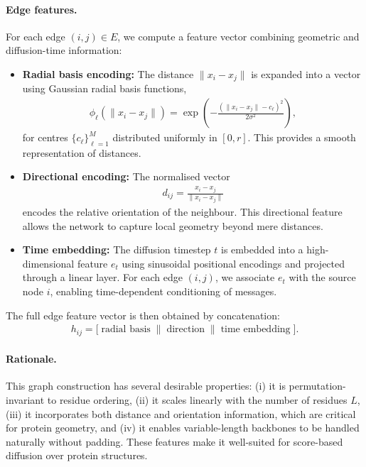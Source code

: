 \documentclass[a4paper,12pt]{article}
\begin{document}
\paragraph{Edge features.}
For each edge \((i,j) \in E\), we compute a feature vector combining geometric and diffusion-time information:
\begin{itemize}
    \item \textbf{Radial basis encoding:} The distance \(\|x_i - x_j\|\) is expanded into a vector using Gaussian radial basis functions,
        \begin{align*}
            \phi_\ell(\|x_i - x_j\|) = \exp\!\left(-\frac{(\|x_i - x_j\|-c_\ell)^2}{2\sigma^2}\right),
        \end{align*}
        for centres \(\{c_\ell\}_{\ell=1}^M\) distributed uniformly in \([0,r]\). This provides a smooth representation of distances. 
    \item \textbf{Directional encoding:} The normalised vector
        \begin{align*}
            d_{ij} = \frac{x_i - x_j}{\|x_i - x_j\|}
        \end{align*}
        encodes the relative orientation of the neighbour. This directional feature allows the network to capture local geometry beyond mere distances. 
    \item \textbf{Time embedding:} The diffusion timestep \(t\) is embedded into a high-dimensional feature \(e_t\) using sinusoidal positional encodings and projected through a linear layer. For each edge \((i,j)\), we associate \(e_t\) with the source node \(i\), enabling time-dependent conditioning of messages.
\end{itemize}
The full edge feature vector is then obtained by concatenation:
\begin{align*}
    h_{ij} = \big[ \; \text{radial basis} \;\|\; \text{direction} \;\|\; \text{time embedding} \;\big].
\end{align*}

\paragraph{Rationale.}
This graph construction has several desirable properties: (i) it is permutation-invariant to residue ordering, (ii) it scales linearly with the number of residues \(L\), (iii) it incorporates both distance and orientation information, which are critical for protein geometry, and (iv) it enables variable-length backbones to be handled naturally without padding. These features make it well-suited for score-based diffusion over protein structures.
\end{document}
